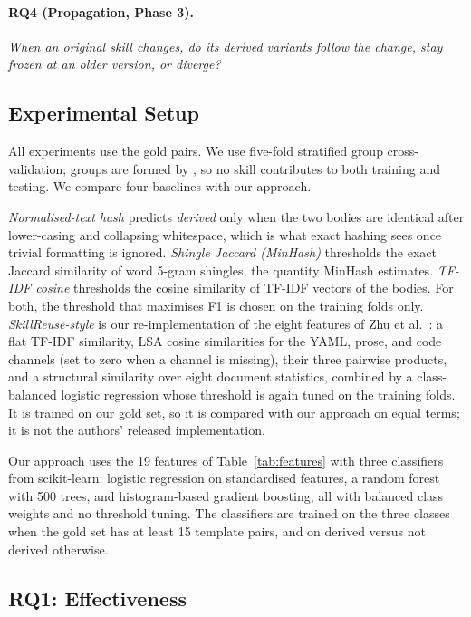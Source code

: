\paragraph{RQ4 (Propagation, Phase 3).} \emph{When an original skill changes, do
its derived variants follow the change, stay frozen at an older version, or diverge?}

\subsection{Experimental Setup}
\label{sec:setup}

All experiments use the \ResGoldPairs{} gold pairs. We use five-fold stratified group
cross-validation; groups are formed by \ResGrouping{}, so no skill contributes to both
training and testing. We compare four baselines with our approach.

\emph{Normalised-text hash} predicts \emph{derived} only when the two bodies are identical
after lower-casing and collapsing whitespace, which is what exact hashing sees once trivial
formatting is ignored. \emph{Shingle Jaccard (MinHash)} thresholds the exact Jaccard similarity
of word 5-gram shingles, the quantity MinHash estimates. \emph{TF-IDF cosine} thresholds the
cosine similarity of TF-IDF vectors of the bodies. For both, the threshold that maximises F1
is chosen on the training folds only. \emph{SkillReuse-style} is our re-implementation of the
eight features of Zhu et al.~\cite{zhu2026skillreuse}: a flat TF-IDF similarity, LSA cosine
similarities for the YAML, prose, and code channels (set to zero when a channel is missing),
their three pairwise products, and a structural similarity over eight document statistics,
combined by a class-balanced logistic regression whose threshold is again tuned on the
training folds. It is trained on our gold set, so it is compared with our approach on equal
terms; it is not the authors' released implementation.

Our approach uses the 19 features of Table~\ref{tab:features} with three classifiers from
scikit-learn: logistic regression on standardised features, a random forest with 500 trees,
and histogram-based gradient boosting, all with balanced class weights and no threshold
tuning. The classifiers are trained on the three classes when the gold set has at least 15
template pairs, and on derived versus not derived otherwise.

\subsection{RQ1: Effectiveness}

